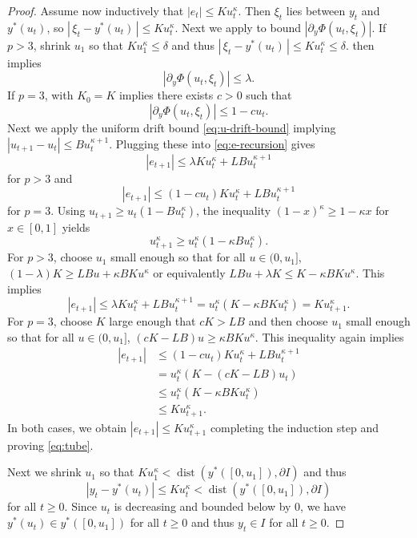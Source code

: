 \documentclass{article}
\begin{document}
\begin{proof}
    Assume now inductively that $|e_t|\le K u_t^\kappa$.
    Then $\xi_t$ lies between $y_t$ and $y^*(u_t)$, so $|\,\xi_t-y^*(u_t)\,|\le K u_t^\kappa$.
    Next we apply  to bound $|\partial_y\Phi(u_t,\xi_t)|$.
    If $p>3$, shrink $u_1$ so that $K u_1^\kappa\le\delta$ and thus
    $|\,\xi_t-y^*(u_t)\,|\le K u_t^\kappa \leq \delta$.
     then implies
    \[
        |\partial_y\Phi(u_t,\xi_t)|
        \le \lambda.
    \]
    If $p=3$,  with $K_0=K$ implies there exists $c>0$ such that
    \[
        |\partial_y\Phi(u_t,\xi_t)|\le 1-cu_t.
    \]
    Next we apply the uniform drift bound \eqref{eq:u-drift-bound} implying $|u_{t+1}-u_t|\le B u_t^{\kappa+1}$.
    Plugging these into \eqref{eq:e-recursion} gives
    \[
        |e_{t+1}|\le \lambda K u_t^\kappa + LB u_t^{\kappa+1}
    \]
    for $p>3$ and
    \[
        |e_{t+1}|\le (1-cu_t)K u_t^\kappa + LB u_t^{\kappa+1}
    \]
    for $p=3$.
    Using $u_{t+1}\ge u_t(1-Bu_t^\kappa)$, the inequality
    $(1-x)^\kappa\ge 1-\kappa x$ for $x\in[0,1]$ yields
    \[
        u_{t+1}^\kappa\ge u_t^\kappa(1-\kappa B u_t^\kappa).
    \]
    For $p>3$, choose $u_1$ small enough so that for all $u\in(0,u_1]$,
    $(1-\lambda)K \ge LB u + \kappa BK u^\kappa$ or equivalently
    $LBu + \lambda K \le K- \kappa BK u^\kappa$. This implies
    \begin{equation*}
        |e_{t+1}|
        \le \lambda K u_t^\kappa + LB u_t^{\kappa+1}
        = u_t^\kappa(K-\kappa BK u_t^\kappa)
        = K u_{t+1}^\kappa.
    \end{equation*}
    For $p=3$, choose $K$ large enough that $cK>LB$ and then choose $u_1$ small
    enough so that for all $u\in(0,u_1]$,
    $(cK-LB)u \ge \kappa BK u^\kappa$.
    This inequality again implies
    \begin{align*}
        |e_{t+1}|
        & \le (1-cu_t)K u_t^\kappa + LB u_t^{\kappa+1} \\
        & = u_t^\kappa (K - (cK - LB)u_t) \\
        & \le  u_t^\kappa (K - \kappa BK u_t^\kappa) \\
        & \le K u_{t+1}^\kappa. 
    \end{align*}
    In both cases, we obtain $|e_{t+1}|\le K u_{t+1}^\kappa$ completing the
    induction step and proving \eqref{eq:tube}.

    Next we shrink $u_1$ so that $K u_1^\kappa < \operatorname{dist}(y^*([0,u_1]), \partial I)$
    and thus
    \[
        |y_t-y^*(u_t)|\le K u_t^\kappa < \operatorname{dist}(y^*([0,u_1]), \partial I)
    \]
    for all $t\ge 0$.
    Since $u_t$ is decreasing and bounded below by $0$, we have $y^*(u_t)\in y^*([0,u_1])$ for all $t\ge 0$ and thus $y_t\in I$ for all $t\ge 0$.


\end{proof}
\end{document}
